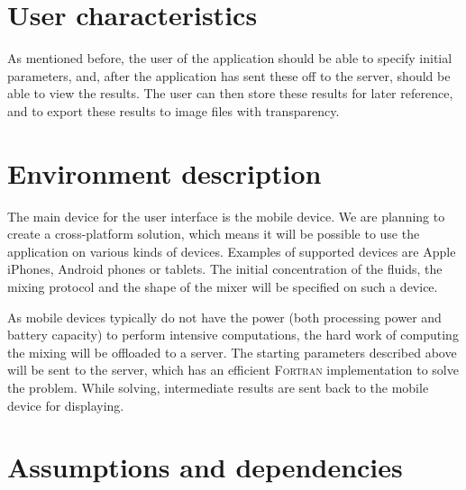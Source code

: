 \section{User characteristics}
As mentioned before, the user of the application should be able to specify initial parameters, and, after the application has sent these off to the server, should be able to view the results. The user can then store these results for later reference, and to export these results to image files with transparency.

\section{Environment description}
The main device for the user interface is the mobile device. We are planning to create a cross-platform solution, which means it will be possible to use the application on various kinds of devices. Examples of supported devices are Apple iPhones, Android phones or tablets. The initial concentration of the fluids, the mixing protocol and the shape of the mixer will be specified on such a device.

As mobile devices typically do not have the power (both processing power and battery capacity) to perform intensive computations, the hard work of computing the mixing will be offloaded to a server. The starting parameters described above will be sent to the server, which has an efficient \textsc{Fortran} implementation to solve the problem. While solving, intermediate results are sent back to the mobile device for displaying.

\section{Assumptions and dependencies}
